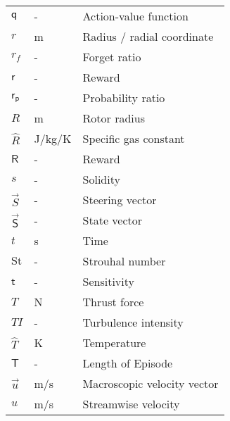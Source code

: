 \begin{longtable}{p{5cm}p{4cm}p{5cm}}
    $\mathsf{q}$			& \si{-}		& Action-value function \\
    $r$						& \si{m}		& Radius / radial coordinate \\
    $r_f$					& \si{-}		& Forget ratio \\
    $\mathsf{r}$			& \si{-}		& Reward \\	
    $\mathsf{r_p}$			& \si{-}		& Probability ratio \\
    $R$						& \si{m}		& Rotor radius \\
    $\hat{R}$               & \si{J/kg/K} 	& Specific gas constant \\ 
    $\mathsf{R}$			& \si{-}		& Reward \\	
    $s$						& \si{-}		& Solidity \\
    $\vec{S}$				& \si{-}		& Steering vector \\
    $\vec{\mathsf{S}}$		& \si{-}		& State vector \\
    $t$                     & \si{s}      	& Time  \\
    $\mathrm{St}$			& \si{-}		& Strouhal number \\
    $\mathsf{t}$			& \si{-}		& Sensitivity \\
    $T$                     & \si{N}      	& Thrust force \\
    $TI$					& \si{-}		& Turbulence intensity \\
    $\hat{T}$				& \si{K}		& Temperature \\
    $\mathsf{T}$			& \si{-}		& Length of Episode \\
    $\vec{u}$               & \si{m/s}    	& Macroscopic velocity vector \\
    $u$                     & \si{m/s}    	& Streamwise velocity \\

\end{longtable}
